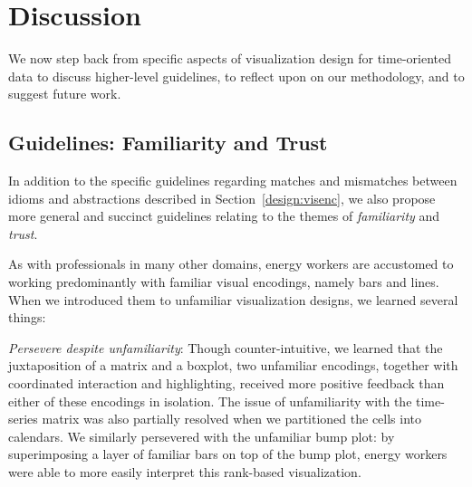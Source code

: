 \documentclass[journal]{vgtc}                %
\newcommand{\bstart}[1]{\vspace{1mm} \noindent{\textbf{#1:}}}
\begin{document}

\section{Discussion}
\label{discussion}


We now step back from specific aspects of visualization design for time-oriented data to discuss higher-level guidelines, to reflect upon on our methodology, and to suggest future work.


\subsection{Guidelines: Familiarity and Trust}
\label{discussion-guidelines}


In addition to the specific guidelines regarding matches and mismatches between idioms and abstractions described in Section~\ref{design:visenc}, we also propose more general and succinct guidelines relating to the themes of {\it familiarity} and {\it trust}.

\bstart{Familiarity} As with professionals in many other domains, energy workers are accustomed to working predominantly with familiar visual encodings, namely bars and lines.
When we introduced them to unfamiliar visualization designs, we learned several things:

{\it Persevere despite unfamiliarity}: Though counter-intuitive, we learned that the juxtaposition of a matrix and a boxplot, two unfamiliar encodings, together with coordinated interaction and highlighting, received more positive feedback than either of these encodings in isolation.
The issue of unfamiliarity with the time-series matrix was also partially resolved when we partitioned the cells into calendars.
We similarly persevered with the unfamiliar bump plot: by superimposing a layer of familiar bars on top of the bump plot, energy workers were able to more easily interpret this rank-based visualization.
\end{document}
